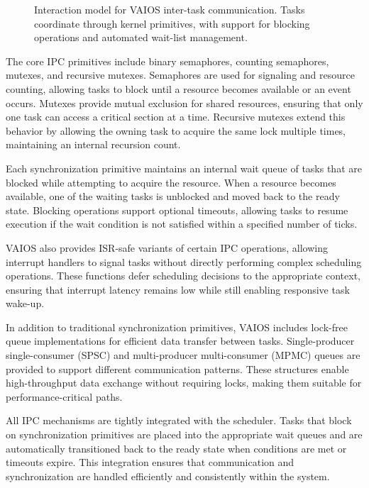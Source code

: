 \begin{figure}[H]
    \caption{Interaction model for VAIOS inter-task communication. Tasks coordinate through kernel primitives, with support for blocking operations and automated wait-list management.}
    \label{fig:vaios_ipc_interaction}
\end{figure}

The core IPC primitives include binary semaphores, counting semaphores, mutexes, and recursive mutexes. Semaphores are used for signaling and resource counting, allowing tasks to block until a resource becomes available or an event occurs. Mutexes provide mutual exclusion for shared resources, ensuring that only one task can access a critical section at a time. Recursive mutexes extend this behavior by allowing the owning task to acquire the same lock multiple times, maintaining an internal recursion count.

Each synchronization primitive maintains an internal wait queue of tasks that are blocked while attempting to acquire the resource. When a resource becomes available, one of the waiting tasks is unblocked and moved back to the ready state. Blocking operations support optional timeouts, allowing tasks to resume execution if the wait condition is not satisfied within a specified number of ticks.

VAIOS also provides ISR-safe variants of certain IPC operations, allowing interrupt handlers to signal tasks without directly performing complex scheduling operations. These functions defer scheduling decisions to the appropriate context, ensuring that interrupt latency remains low while still enabling responsive task wake-up.

In addition to traditional synchronization primitives, VAIOS includes lock-free queue implementations for efficient data transfer between tasks. Single-producer single-consumer (SPSC) and multi-producer multi-consumer (MPMC) queues are provided to support different communication patterns. These structures enable high-throughput data exchange without requiring locks, making them suitable for performance-critical paths.

All IPC mechanisms are tightly integrated with the scheduler. Tasks that block on synchronization primitives are placed into the appropriate wait queues and are automatically transitioned back to the ready state when conditions are met or timeouts expire. This integration ensures that communication and synchronization are handled efficiently and consistently within the system.

